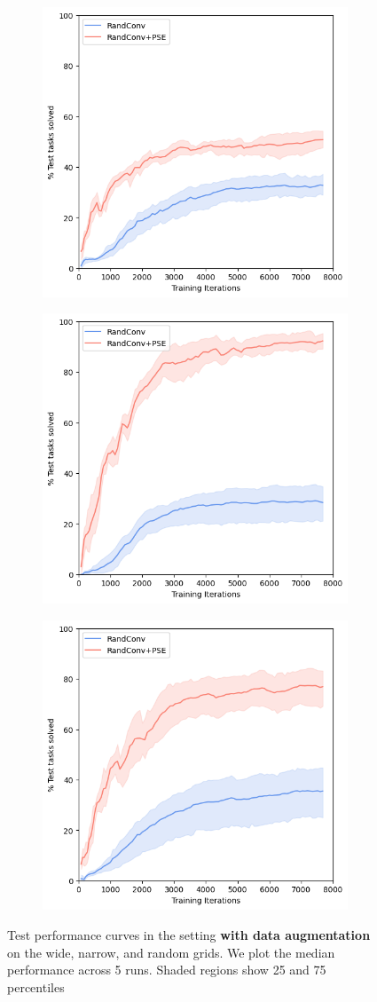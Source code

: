 \documentclass{usiinftr}
\begin{document}
\begin{figure}[h]
    \centering
    \begin{subfigure}
        \centering
        \includegraphics[width = 0.3\linewidth]{figures/narrow_with_data_aug.png}
        \label{}
    \end{subfigure}%
    \begin{subfigure}
        \centering
        \includegraphics[width = 0.3\linewidth]{figures/wide_with_data_aug.png}
        \label{}
    \end{subfigure}%
    \begin{subfigure}
        \centering
        \includegraphics[width = 0.3\linewidth]{figures/random_with_data_aug.png}
        \label{}
    \end{subfigure}%
    \caption{Test performance curves in the setting \textbf{with data augmentation} on the wide, narrow, and random grids. We plot the median performance across 5 runs. Shaded regions show 25 and 75 percentiles}
    \label{fig:ResultWithDataAug}
\end{figure}
\end{document}
